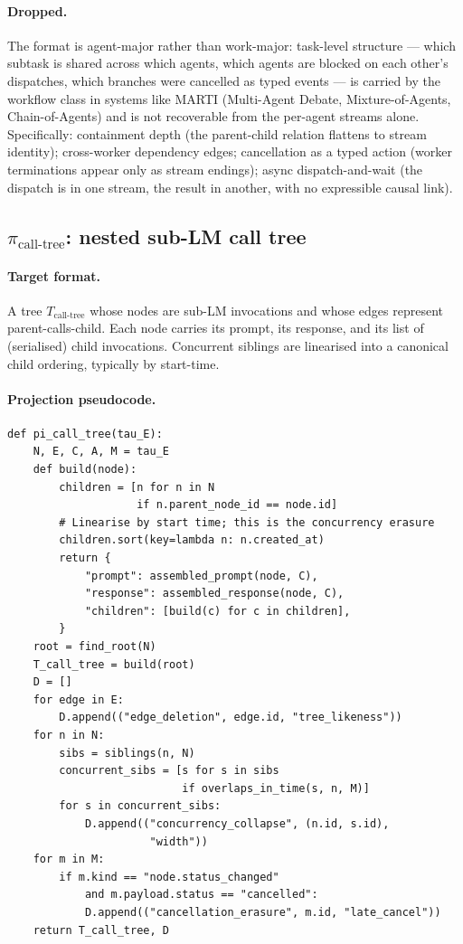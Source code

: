 \documentclass{article}
\begin{document}
\paragraph{Dropped.} The format is agent-major rather than
work-major: task-level structure --- which subtask is shared
across which agents, which agents are blocked on each other's
dispatches, which branches were cancelled as typed events --- is
carried by the workflow class in systems like MARTI (Multi-Agent
Debate, Mixture-of-Agents, Chain-of-Agents) and is not
recoverable from the per-agent streams alone. Specifically:
containment depth (the parent-child relation flattens to stream
identity); cross-worker dependency edges; cancellation as a
typed action (worker terminations appear only as stream
endings); async dispatch-and-wait (the dispatch is in one
stream, the result in another, with no expressible causal link).

\subsection{$\pi_{\text{call-tree}}$: nested sub-LM call tree}
\label{app:proj:call-tree}

\paragraph{Target format.} A tree $T_{\text{call-tree}}$ whose
nodes are sub-LM invocations and whose edges represent
parent-calls-child. Each node carries its prompt, its response,
and its list of (serialised) child invocations. Concurrent siblings
are linearised into a canonical child ordering, typically by
start-time.

\paragraph{Projection pseudocode.}
\begin{lstlisting}
def pi_call_tree(tau_E):
    N, E, C, A, M = tau_E
    def build(node):
        children = [n for n in N
                    if n.parent_node_id == node.id]
        # Linearise by start time; this is the concurrency erasure
        children.sort(key=lambda n: n.created_at)
        return {
            "prompt": assembled_prompt(node, C),
            "response": assembled_response(node, C),
            "children": [build(c) for c in children],
        }
    root = find_root(N)
    T_call_tree = build(root)
    D = []
    for edge in E:
        D.append(("edge_deletion", edge.id, "tree_likeness"))
    for n in N:
        sibs = siblings(n, N)
        concurrent_sibs = [s for s in sibs
                           if overlaps_in_time(s, n, M)]
        for s in concurrent_sibs:
            D.append(("concurrency_collapse", (n.id, s.id),
                      "width"))
    for m in M:
        if m.kind == "node.status_changed"
            and m.payload.status == "cancelled":
            D.append(("cancellation_erasure", m.id, "late_cancel"))
    return T_call_tree, D
\end{lstlisting}
\end{document}
